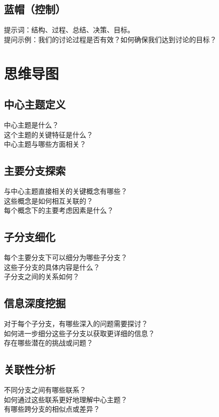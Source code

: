\documentclass[12pt]{book}
\begin{document}
\subsection{蓝帽（控制）}
提示词：结构、过程、总结、决策、目标。\\
提问示例：我们的讨论过程是否有效？如何确保我们达到讨论的目标？\\


\section{思维导图}
\subsection{中心主题定义}
中心主题是什么？\\
这个主题的关键特征是什么？\\
中心主题与哪些方面相关？\\

\subsection{主要分支探索}
与中心主题直接相关的关键概念有哪些？\\
这些概念是如何相互关联的？\\
每个概念下的主要考虑因素是什么？\\

\subsection{子分支细化}
每个主要分支下可以细分为哪些子分支？\\
这些子分支的具体内容是什么？\\
子分支之间的关系如何？\\

\subsection{信息深度挖掘}
对于每个子分支，有哪些深入的问题需要探讨？\\
如何进一步细分这些子分支以获取更详细的信息？\\
存在哪些潜在的挑战或问题？\\

\subsection{关联性分析}
不同分支之间有哪些联系？\\
如何通过这些联系更好地理解中心主题？\\
有哪些跨分支的相似点或差异？\\
\end{document}
